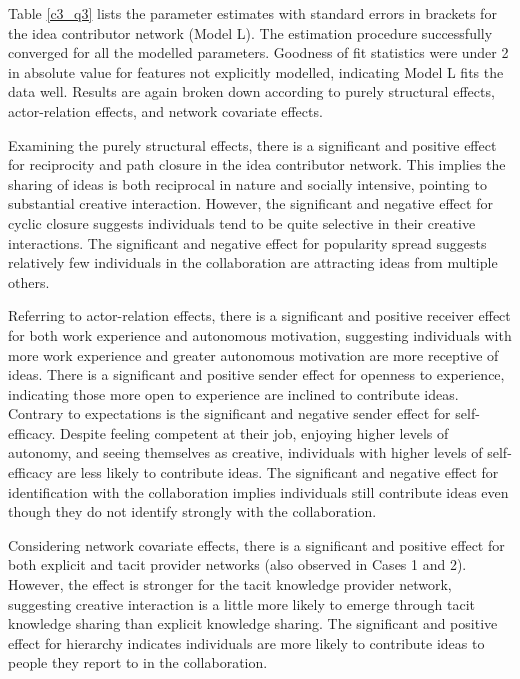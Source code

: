 Table \ref{c3_q3} lists the parameter estimates with standard errors in brackets for the idea contributor network (Model L). The estimation procedure successfully converged for all the modelled parameters. Goodness of fit statistics were under 2 in absolute value for features not explicitly modelled, indicating Model L fits the data well. Results are again broken down according to purely structural effects, actor-relation effects, and network covariate effects.\medskip 

Examining the purely structural effects, there is a significant and positive effect for reciprocity and path closure in the idea contributor network. This implies the sharing of ideas is both reciprocal in nature and socially intensive, pointing to substantial creative interaction. However, the significant and negative effect for cyclic closure suggests individuals tend to be quite selective in their creative interactions. The significant and negative effect for popularity spread suggests relatively few individuals in the collaboration are attracting ideas from multiple others.\medskip

Referring to actor-relation effects, there is a significant and positive receiver effect for both work experience and autonomous motivation, suggesting individuals with more work experience and greater autonomous motivation are more receptive of ideas. There is a significant and positive sender effect for openness to experience, indicating those more open to experience are inclined to contribute ideas. Contrary to expectations is the significant and negative sender effect for self-efficacy. Despite feeling competent at their job, enjoying higher levels of autonomy, and seeing themselves as creative, individuals with higher levels of self-efficacy are less likely to contribute ideas. The significant and negative effect for identification with the collaboration implies individuals still contribute ideas even though they do not identify strongly with the collaboration.\medskip

Considering network covariate effects, there is a significant and positive effect for both explicit and tacit provider networks (also observed in Cases 1 and 2). However, the effect is stronger for the tacit knowledge provider network, suggesting creative interaction is a little more likely to emerge through tacit knowledge sharing than explicit knowledge sharing. The significant and positive effect for hierarchy indicates individuals are more likely to contribute ideas to people they report to in the collaboration.
      

